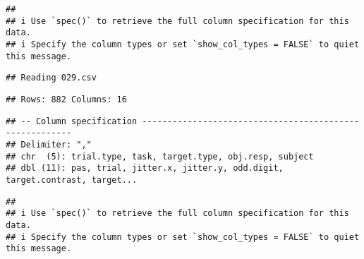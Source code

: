 \documentclass[
]{article}
\newenvironment{Shaded}{\begin{snugshade}}{\end{snugshade}}
\newcommand{\AttributeTok}[1]{\textcolor[rgb]{0.77,0.63,0.00}{#1}}
\newcommand{\DecValTok}[1]{\textcolor[rgb]{0.00,0.00,0.81}{#1}}
\newcommand{\FunctionTok}[1]{\textcolor[rgb]{0.00,0.00,0.00}{#1}}
\newcommand{\NormalTok}[1]{#1}
\newcommand{\OtherTok}[1]{\textcolor[rgb]{0.56,0.35,0.01}{#1}}
\newcommand{\SpecialCharTok}[1]{\textcolor[rgb]{0.00,0.00,0.00}{#1}}
\newcommand{\StringTok}[1]{\textcolor[rgb]{0.31,0.60,0.02}{#1}}
\begin{document}
\begin{verbatim}
## 
## i Use `spec()` to retrieve the full column specification for this data.
## i Specify the column types or set `show_col_types = FALSE` to quiet this message.
\end{verbatim}

\begin{verbatim}
## Reading 029.csv
\end{verbatim}

\begin{verbatim}
## Rows: 882 Columns: 16
\end{verbatim}

\begin{verbatim}
## -- Column specification --------------------------------------------------------
## Delimiter: ","
## chr  (5): trial.type, task, target.type, obj.resp, subject
## dbl (11): pas, trial, jitter.x, jitter.y, odd.digit, target.contrast, target...
\end{verbatim}

\begin{verbatim}
## 
## i Use `spec()` to retrieve the full column specification for this data.
## i Specify the column types or set `show_col_types = FALSE` to quiet this message.
\end{verbatim}

\begin{Shaded}
\end{Shaded}
\end{document}
